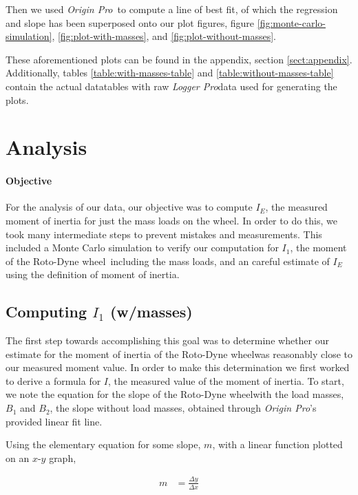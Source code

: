 \documentclass[coverpage]{article}
\newcommand{\softwareText}[1]{\textit{#1}\texttrademark}
\newcommand{\loggerpro}{\softwareText{Logger Pro}}
\newcommand{\origin}{\softwareText{Origin Pro}}
\newcommand{\rwheel}{Roto-Dyne wheel}
\begin{document}
	Then we used \origin~to compute a line of best fit, of which the regression and slope has been superposed onto our plot figures, figure \ref{fig:monte-carlo-simulation}, \ref{fig:plot-with-masses}, and \ref{fig:plot-without-masses}.
	
	These aforementioned plots can be found in the appendix, section \ref{sect:appendix}. Additionally, tables \ref{table:with-masses-table} and \ref{table:without-masses-table} contain the actual datatables with raw \loggerpro data used for generating the plots.
	
	\section{Analysis}
	
	\paragraph{Objective}
	
	For the analysis of our data, our objective was to compute $I_E$, the measured moment of inertia for just the mass loads on the wheel. In order to do this, we took many intermediate steps to prevent mistakes and measurements. This included a Monte Carlo simulation to verify our computation for $I_1$, the moment of the \rwheel~including the mass loads, and an careful estimate of $I_E$ using the definition of moment of inertia. 
	
	\subsection{Computing $I_1$ (w/masses)}
	
	The first step towards accomplishing this goal was to determine whether our estimate for the moment of inertia of the \rwheel was reasonably close to our measured moment value. In order to make this determination we first worked to derive a formula for $I$, the measured value of the moment of inertia. To start, we note the equation for the slope of the \rwheel with the load masses, $B_1$ and $B_2$, the slope without load masses, obtained through \origin's provided linear fit line.
	
	Using the elementary equation for some slope, $m$, with a linear function plotted on an $x$-$y$ graph,
	
	\begin{align}
		m &= \frac{\Delta{y}}{\Delta{x}}
	\end{align}
\end{document}
